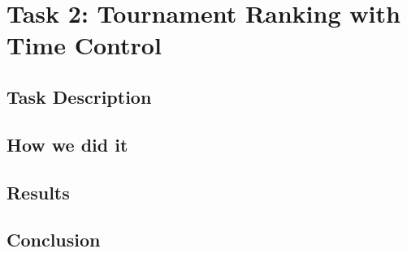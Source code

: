 \section{Task 2: Tournament Ranking with Time Control}
\subsection{Task Description}
\subsection{How we did it}
\subsection{Results}
\subsection{Conclusion}
